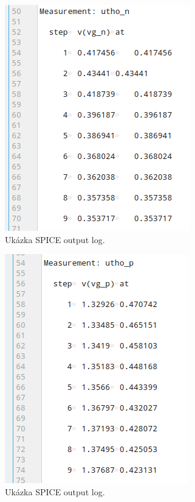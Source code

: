 \begin{figure}[h!]
    \centering
    \includegraphics[]{img/log1.png}
    \caption{Ukázka SPICE output log.}
    \label{fig:img/log1.png}
\end{figure}


\begin{figure}[h!]
    \centering
    \includegraphics[]{img/log2.png}
    \caption{Ukázka SPICE output log.}
    \label{fig:img/log1.png}
\end{figure}

